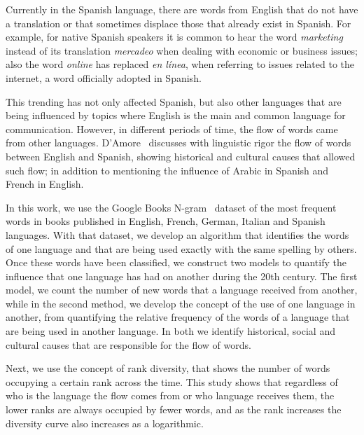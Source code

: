 \documentclass[10pt,letterpaper]{article} %
\begin{document}
	Currently in the Spanish language, there are words from English 
	that do not have a translation or that sometimes displace those that already
	exist in Spanish.  For example, for native Spanish speakers it is common to
	hear the word \textit{marketing} instead of its translation \textit{mercadeo}
	when dealing with economic or business issues; also the word \textit{online}
	has replaced \textit{en línea}, when referring to issues related to the
	internet, a word officially adopted in Spanish.
	
	This trending has not only affected Spanish,  but also other languages that are
	being influenced by topics where English is the main and common language for
	communication. However, in different periods of time, the flow of words came
	from other languages. D’Amore~\cite{Damore_influencia_mutua} discusses with linguistic rigor the
	flow of words between English and Spanish,  showing historical  and cultural
	causes that allowed such flow; in addition to mentioning the influence of
	Arabic in Spanish and French in English. 
	
	In this work, we use the Google Books N-gram~\cite{ngramv} dataset of the most
	frequent words in books published in  English, French, German, Italian and
	Spanish languages.  With that dataset,  we develop an algorithm that identifies
	the words of one language  and that are being used exactly with the same 
	spelling by others. Once these words
	have been classified, we construct two models to quantify  the influence that
	one language has had on another during the 20th century. The first model, we
	count the number of new words that a language received from another, while in
	the second method, we develop the concept of the use of one language in
	another,  from quantifying the relative frequency of  the words of a language
	that are being used in another language. In both we identify historical, social
	and cultural causes that are responsible for the flow of words.
	
	Next, we use the concept of rank diversity,  that shows the number of words
	occupying a certain rank across the time. This study shows that  regardless of
	who is the language the flow comes from or who language receives them,  the
	lower ranks are always occupied by fewer  words, and as the rank increases the
	diversity curve also increases as a logarithmic. 
	
	
\end{document}
